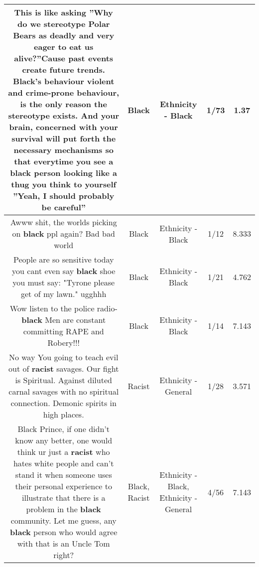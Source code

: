 \documentclass[11pt]{article}
\newlength\mylength
\begin{document}
\begin{center}
\begin{longtable}{|C{.65\mylength}|C{.30\mylength}|C{.12\mylength}|C{.12\mylength}|C{.12\mylength}|}
  \small This is like asking ''Why do we stereotype Polar Bears as deadly and very eager to eat us alive?''Cause past events create future trends. \textbf{Black}'s behaviour violent and crime-prone behaviour, is the only reason the stereotype exists. And your brain, concerned with your survival will put forth the necessary mechanisms so that everytime you see a \textbf{black} person looking like a thug you think to yourself ''Yeah, I should probably be careful''\normalsize   & Black & Ethnicity - Black & 1/73 & 1.37 \\  \hline
  \small Awww shit, the worlds picking on \textbf{black} ppl again? Bad bad world\normalsize   & Black & Ethnicity - Black & 1/12 & 8.333 \\  \hline
  \small People are so sensitive today you cant even say \textbf{black} shoe you must say: "Tyrone please get of my lawn." ugghhh\normalsize   & Black & Ethnicity - Black & 1/21 & 4.762 \\  \hline
  \small Wow listen to the police radio- \textbf{black} Men are constant committing RAPE and Robery!!!\normalsize   & Black & Ethnicity - Black & 1/14 & 7.143 \\  \hline
  \small No way You going to teach evil out of \textbf{racist} savages. Our fight is Spiritual. Against diluted carnal savages with no spiritual connection. Demonic spirits in high places.\normalsize   & Racist & Ethnicity - General & 1/28 & 3.571 \\  \hline
  \small Black Prince, if one didn't know any better, one would think ur just a \textbf{racist} who hates white people and can't stand it when someone uses their personal experience to illustrate that there is a problem in the \textbf{black} community. Let me guess, any \textbf{black} person who would agree with that is an Uncle Tom right?\normalsize   & Black, Racist & Ethnicity - Black, Ethnicity - General & 4/56 & 7.143 \\  \hline

\end{longtable}
\end{center}
\end{document}

